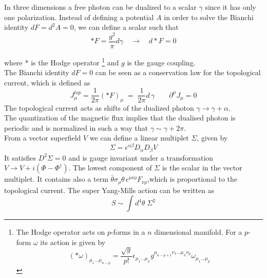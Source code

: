 In three dimensions a free photon can be dualized to a scalar $\gamma$ since it has only one polarization.
Instead of defining a potential $A$ in order to solve the Bianchi identity $d F = d^2 A = 0$, we can define a scalar such that
\begin{equation}
  * F = \frac{g^2}{\pi} d  \gamma  \quad \rightarrow \quad d * F  = 0  
\end{equation} 

where 
$*$ is the Hodge operator \footnote{
  The Hodge operator acts on $p$-forms in a $n$ dimensional manifold.
  For a $p$-form $\omega$ its action is given by 
  $$
    ( * \omega)_{\mu_1 \dots \mu_{n-p}} = \frac{\sqrt{g}}{p!} \epsilon_{\mu_1 \dots \mu_n} g^{\mu_{n-p+1} \nu_1 \dots \mu_{n} \nu_p } \omega_{\mu_1 \dots \mu_p}
  $$
}
and 
$g$ is the gauge coupling.\\
The Bianchi identity $d F = 0$ can be seen as a conservation law for the topological current, which is defined as
\begin{equation}
 J_{\mu}^{top} = \frac{1}{2 \pi} ( * F)_{\mu} \; =  \; \frac{1}{2 \pi} d \, \gamma \qquad \partial^{\mu} J_{\mu} =0
\end{equation}
The topological current acts as shifts of the dualized photon $\gamma \rightarrow \gamma + \alpha$.\\
The quantization of the magnetic flux implies that the dualised photon is periodic and is normalized in such a way that $\gamma \sim \gamma + 2 \pi$.
\\
From a vector superfield $V$ we can define a linear multiplet $\Sigma$, given by
\begin{equation}
 \Sigma = \epsilon^{\alpha \beta} D_{\alpha} D_{\beta} V
 \label{eqn:linear_multiplet_gauge}
\end{equation}
It satisfies $D^2 \Sigma = 0$ and is gauge invariant under a transformation $V \rightarrow V + i (\Phi - \Phi^{\dagger})$.
The lowest component of $\Sigma$ is the scalar in the vector multiplet.
It contains also a term $ \bar{\theta} \sigma_{\rho} \theta \, \epsilon^{\mu \nu \rho} F_{\nu \rho}$,which is proportional to the topological current.
The super Yang-Mills action can be written as
\begin{equation}
S \sim \int d^4 \theta \; \Sigma^2
\end{equation}
